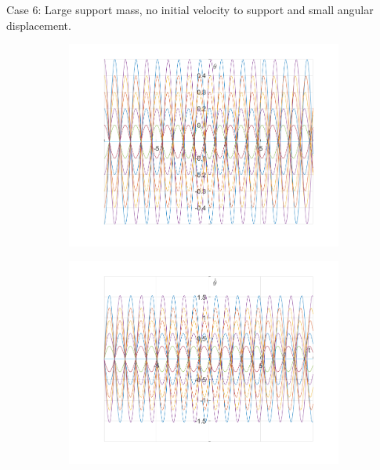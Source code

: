 \documentclass{article}
\begin{document}
	Case 6:
	Large support mass, no initial velocity to support and small angular displacement.
			\begin{figure}[h!]
		\centering
		\begin{subfigure}[b]{0.48\linewidth}
			\includegraphics[width=\linewidth]{./SmallOscillations/S6/F1.png}
		\end{subfigure}
		\begin{subfigure}[b]{0.48\linewidth}
			\includegraphics[width=\linewidth]{./SmallOscillations/S6/F2.png}
		\end{subfigure}
	\end{figure}
\end{document}
